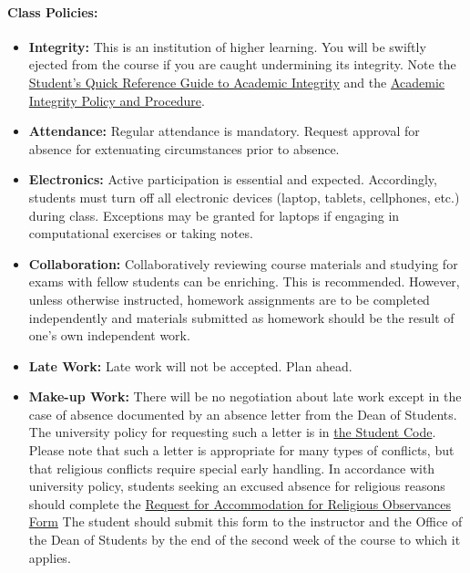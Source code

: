 \documentclass[11pt]{article}
\begin{document}
\paragraph{Class Policies:}


\begin{itemize}
\item[] \textbf{Integrity:} This is an institution of higher
learning. You will be swiftly ejected from the course if you are caught
undermining its integrity. Note the
\href{http://www.provost.illinois.edu/academicintegrity/students.html}{Student's
Quick Reference Guide to Academic Integrity} and the
\href{http://studentcode.illinois.edu/article1_part4_1-401.html}{Academic
Integrity Policy and Procedure}.
\item[] \textbf{Attendance:} Regular attendance is mandatory. Request approval for absence for extenuating circumstances prior to absence.
\item[] \textbf{Electronics:} Active participation is essential and expected.
        Accordingly, students must turn off all electronic devices (laptop,
        tablets, cellphones, etc.) during class. Exceptions may be granted for
        laptops if engaging in computational exercises or taking notes.
\item[] \textbf{Collaboration:} Collaboratively reviewing course materials and studying for exams with fellow students can be enriching.  This is recommended.  However, unless otherwise instructed, homework assignments are to be completed independently and materials submitted as homework should be the result of one's own independent work.
\item[] \textbf{Late Work:} Late work will not be accepted. Plan ahead.

\item[] \textbf{Make-up Work:} There will be no negotiation about late work
        except in the case of absence documented by an absence letter from the
        Dean of Students.  The university policy for requesting such a letter
        is in
        \href{http://studentcode.illinois.edu/article1_part5_1-501.html}{the
        Student Code}. Please note that such a letter is appropriate for many
        types of conflicts, but that religious conflicts require special early
        handling. In accordance with university policy, students seeking an
        excused absence for religious reasons should complete the
	\href{http://odos.illinois.edu/community-of-care/resources/students/religious-observances/}{Request for Accommodation for Religious Observances Form}
        The student should submit this
        form to the instructor and the Office of the Dean of Students by the end of the
        second week of the course to which it applies.



\end{itemize}
\end{document}
